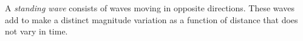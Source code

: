 

\label{m0086_Standing_Waves}  %

\begin{mdframed}[backgroundcolor=yellow!20,nobreak=true] 
A \emph{standing wave} 
consists of waves moving in opposite directions.  These waves add to make a distinct magnitude variation as a function of distance that does not vary in time. 
\end{mdframed}

